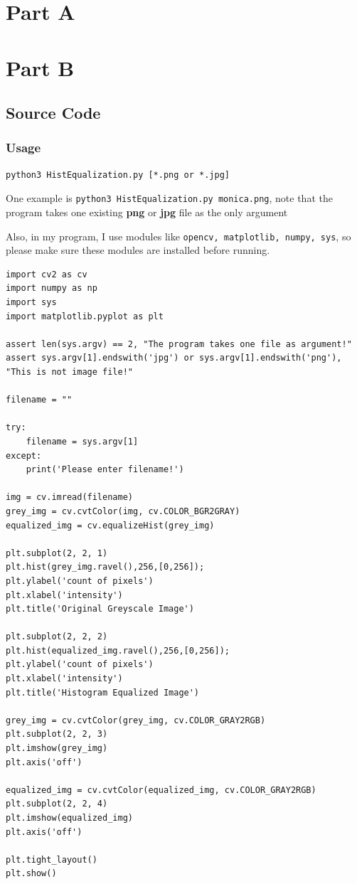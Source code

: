 \documentclass[12pt]{article}
\title{\mytitle}
\author{\myauthor}
\date{}
\begin{document}
\onehalfspacing
\maketitle

\section{Part A}

\newpage
\section{Part B}
\subsection{Source Code}
\subsubsection{Usage}
\begin{Verbatim}[linenos]
python3 HistEqualization.py [*.png or *.jpg]
\end{Verbatim}

One example is \texttt{python3 HistEqualization.py monica.png}, note that the program takes one existing \textbf{png} or \textbf{jpg} file as the only argument

Also, in my program, I use modules like \texttt{opencv, matplotlib, numpy, sys}, so please make sure these modules are installed before running.
\begin{verbatim}
import cv2 as cv
import numpy as np
import sys
import matplotlib.pyplot as plt

assert len(sys.argv) == 2, "The program takes one file as argument!"
assert sys.argv[1].endswith('jpg') or sys.argv[1].endswith('png'), "This is not image file!"

filename = ""

try:
    filename = sys.argv[1]
except:
    print('Please enter filename!')

img = cv.imread(filename)
grey_img = cv.cvtColor(img, cv.COLOR_BGR2GRAY)
equalized_img = cv.equalizeHist(grey_img)

plt.subplot(2, 2, 1)
plt.hist(grey_img.ravel(),256,[0,256]);
plt.ylabel('count of pixels')
plt.xlabel('intensity')
plt.title('Original Greyscale Image')

plt.subplot(2, 2, 2)
plt.hist(equalized_img.ravel(),256,[0,256]);
plt.ylabel('count of pixels')
plt.xlabel('intensity')
plt.title('Histogram Equalized Image')

grey_img = cv.cvtColor(grey_img, cv.COLOR_GRAY2RGB)
plt.subplot(2, 2, 3)
plt.imshow(grey_img)
plt.axis('off')

equalized_img = cv.cvtColor(equalized_img, cv.COLOR_GRAY2RGB)
plt.subplot(2, 2, 4)
plt.imshow(equalized_img)
plt.axis('off')

plt.tight_layout()
plt.show()
\end{verbatim}
\end{document}
